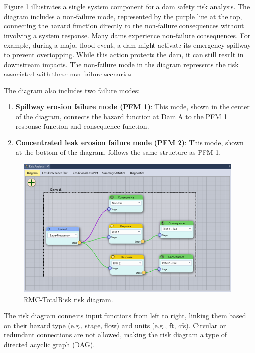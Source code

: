 \documentclass[
]{book}
\begin{document}
Figure \ref{fig:figure-131} illustrates a single system component for a dam safety risk analysis. The diagram includes a non-failure mode, represented by the purple line at the top, connecting the hazard function directly to the non-failure consequences without involving a system response. Many dams experience non-failure consequences. For example, during a major flood event, a dam might activate its emergency spillway to prevent overtopping. While this action protects the dam, it can still result in downstream impacts. The non-failure mode in the diagram represents the risk associated with these non-failure scenarios.

The diagram also includes two failure modes:

\begin{enumerate}
\def\labelenumi{\arabic{enumi}.}
\item
  \textbf{Spillway erosion failure mode (PFM 1)}: This mode, shown in the center of the diagram, connects the hazard function at Dam A to the PFM 1 response function and consequence function.
\item
  \textbf{Concentrated leak erosion failure mode (PFM 2)}: This mode, shown at the bottom of the diagram, follows the same structure as PFM 1.
\end{enumerate}

\begin{figure}

{\centering \includegraphics{images/figure131} 

}

\caption{RMC-TotalRisk risk diagram.}\label{fig:figure-131}
\end{figure}

The risk diagram connects input functions from left to right, linking them based on their hazard type (e.g., stage, flow) and units (e.g., ft, cfs). Circular or redundant connections are not allowed, making the risk diagram a type of directed acyclic graph (DAG).
\end{document}
